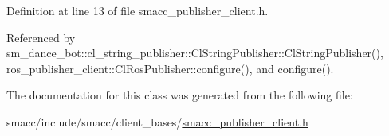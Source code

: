 Definition at line 13 of file smacc\+\_\+publisher\+\_\+client.\+h.



Referenced by sm\+\_\+dance\+\_\+bot\+::cl\+\_\+string\+\_\+publisher\+::\+Cl\+String\+Publisher\+::\+Cl\+String\+Publisher(), ros\+\_\+publisher\+\_\+client\+::\+Cl\+Ros\+Publisher\+::configure(), and configure().



The documentation for this class was generated from the following file\+:\begin{DoxyCompactItemize}
\item 
smacc/include/smacc/client\+\_\+bases/\hyperlink{smacc__publisher__client_8h}{smacc\+\_\+publisher\+\_\+client.\+h}\end{DoxyCompactItemize}
